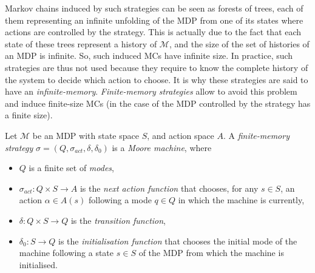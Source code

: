 Markov chains induced by such strategies can be seen as forests of trees, each of them representing an infinite
unfolding of the MDP from one of its states where actions are controlled by  the
strategy. This is actually due to the fact that each state of these trees represent a history of $\mathcal{M}$, and the size of the set of histories
of an MDP is infinite. So, such induced MCs have infinite
size.
In practice, such strategies are thus not used because they require to
know the complete history of the system to decide which action to choose. It is why these strategies are said to have an \textit{infinite-memory}. \textit{Finite-memory strategies} allow to avoid this problem and induce finite-size MCs (in the case of the MDP controlled by the strategy has a finite size).

\begin{definition}
Let $\mathcal{M}$ be an MDP with state space $S$, and action space $A$.
A \textit{finite-memory strategy} $\sigma = (Q, \sigma_{act}, \delta, \delta_0)$ is a \textit{Moore machine}, where
\begin{itemize}
	\item $Q$ is a finite set of \textit{modes},
	\item $\sigma_{act}: Q \times S \rightarrow A$ is the \textit{next action function} that chooses, for any $s \in S$, an action $\alpha \in A(s)$ following a mode $q \in Q$ in which the machine is currently,
	\item $\delta: Q \times S \rightarrow Q$ is the \textit{transition function},
	\item $\delta_0: S \rightarrow Q$ is the \textit{initialisation function} that chooses the initial mode of the machine following a state $s \in S$ of the MDP from which the machine is initialised.
\end{itemize}
\end{definition}

